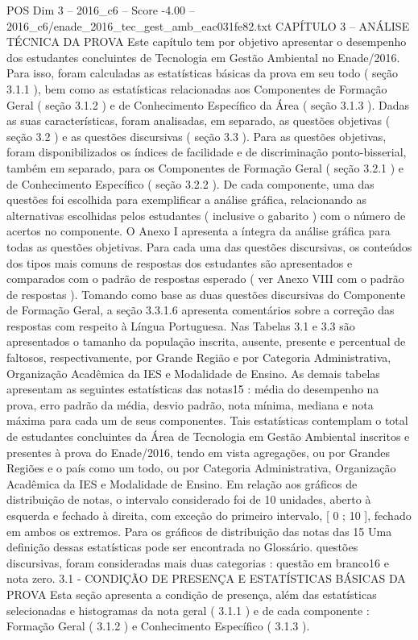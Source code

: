 \begin{textsample}{POS Dim 3 – 2016\_c6 – Score -4.00 – 2016\_c6/enade\_2016\_tec\_gest\_amb\_eac031fe82.txt}  \label{ex:f3_pos_249}
CAPÍTULO 3 – ANÁLISE TÉCNICA DA PROVA Este capítulo tem por objetivo apresentar o desempenho dos estudantes concluintes de Tecnologia em Gestão Ambiental no Enade/2016.
Para isso, foram calculadas as estatísticas básicas da prova em seu todo ( seção 3.1.1 ), bem como as estatísticas relacionadas aos Componentes de Formação Geral ( seção 3.1.2 ) e de Conhecimento Específico da Área ( seção 3.1.3 ).
Dadas as suas características, foram analisadas, em separado, as questões objetivas ( seção 3.2 ) e as questões discursivas ( seção 3.3 ).
Para as questões objetivas, foram disponibilizados os índices de facilidade e de discriminação ponto-bisserial, também em separado, para os Componentes de Formação Geral ( seção 3.2.1 ) e de Conhecimento Específico ( seção 3.2.2 ).
De cada componente, uma das questões foi escolhida para exemplificar a análise gráfica, relacionando as alternativas escolhidas pelos estudantes ( inclusive o gabarito ) com o número de acertos no componente.
O Anexo I apresenta a íntegra da análise gráfica para todas as questões objetivas.
Para cada uma das questões discursivas, os conteúdos dos tipos mais comuns de respostas dos estudantes são apresentados e comparados com o padrão de respostas esperado ( ver Anexo VIII com o padrão de respostas ).
Tomando como base as duas questões discursivas do Componente de Formação Geral, a seção 3.3.1.6 apresenta comentários sobre a correção das respostas com respeito à Língua Portuguesa.
Nas Tabelas 3.1 e 3.3 são apresentados o tamanho da população inscrita, ausente, presente e percentual de faltosos, respectivamente, por Grande Região e por Categoria Administrativa, Organização Acadêmica da IES e Modalidade de Ensino.
As demais tabelas apresentam as seguintes estatísticas das notas15 : média do desempenho na prova, erro padrão da média, desvio padrão, nota mínima, mediana e nota máxima para cada um de seus componentes.
Tais estatísticas contemplam o total de estudantes concluintes da Área de Tecnologia em Gestão Ambiental inscritos e presentes à prova do Enade/2016, tendo em vista agregações, ou por Grandes Regiões e o país como um todo, ou por Categoria Administrativa, Organização Acadêmica da IES e Modalidade de Ensino.
Em relação aos gráficos de distribuição de notas, o intervalo considerado foi de 10 unidades, aberto à esquerda e fechado à direita, com exceção do primeiro intervalo, [ 0 ; 10 ], fechado em ambos os extremos.
Para os gráficos de distribuição das notas das 15 Uma definição dessas estatísticas pode ser encontrada no Glossário. questões discursivas, foram consideradas mais duas categorias : questão em branco16 e nota zero. 3.1 - CONDIÇÃO DE PRESENÇA E ESTATÍSTICAS BÁSICAS DA PROVA Esta seção apresenta a condição de presença, além das estatísticas selecionadas e histogramas da nota geral ( 3.1.1 ) e de cada componente : Formação Geral ( 3.1.2 ) e Conhecimento Específico ( 3.1.3 ).

\end{textsample}
